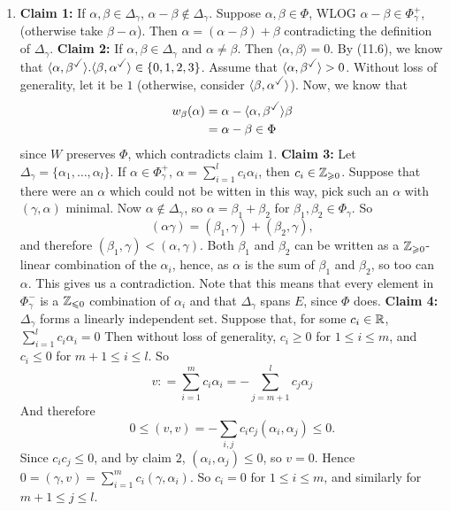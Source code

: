 \documentclass{article}
\begin{document}
\begin{enumerate}
    \item \textbf{Claim 1: }If $\alpha,\beta \in \Delta_{\gamma}$, $\alpha-\beta \notin \Delta_{\gamma}$. \gap Suppose $\alpha, \beta \in \Phi$, WLOG $\alpha-\beta \in \Phi^{+}_{\gamma}$, (otherwise take $\beta - \alpha$). Then $\alpha = (\alpha-\beta) + \beta$ contradicting the definition of $\Delta_{\gamma}$.\gap 
    \textbf{Claim 2: } If $\alpha, \beta \in \Delta_{\gamma}$ and $\alpha \neq \beta$. Then $\langle \alpha, \beta \rangle =0$. By (11.6), we know that $\langle \alpha, \beta^{\checked} \rangle . \langle \beta, \alpha^{\checked} \rangle \in \{0,1,2,3\}$. Assume that $\langle \alpha, \beta^{\checked} \rangle >0$. Without loss of generality, let it be $1$ (otherwise, consider $\langle \beta, \alpha^{\checked} \rangle$). Now, we know that 
    \begin{align*}
         w_{\beta}(\alpha)&=\alpha - \langle \alpha, \beta^{\checked} \rangle \beta\\
         &= \alpha - \beta \in \Phi
    \end{align*}
    since $W$ preserves $\Phi$, which contradicts claim $1$.\gap 
    \textbf{Claim 3: }Let $\Delta_{\gamma} = \{ \alpha_{1}, \dots, \alpha_{l} \}$. If $\alpha \in \Phi^{+}_{\gamma}$, $\alpha = \sum_{i=1}^{l}c_{i}\alpha_{i}$, then $c_{i} \in \mathbb{Z}_{\geqslant 0}$. Suppose that there were an $\alpha$ which could not be witten in this way, pick such an $\alpha$ with $(\gamma,\alpha)$ minimal. Now $\alpha \notin \Delta_{\gamma}$, so $\alpha = \beta_{1} + \beta_{2}$ for $\beta_{1},\beta_{2} \in \Phi_{\gamma}$. So \[ (\alpha \gamma) = (\beta_{1},\gamma) + (\beta_{2},\gamma),\]
    and therefore $(\beta_{1},\gamma)<(\alpha,\gamma)$. Both $\beta_{1}$ and $\beta_{2}$ can be written as a $\mathbb{Z}_{\geqslant 0}$-linear combination of the $\alpha_{i}$, hence, as $\alpha$ is the sum of $\beta_{1}$ and $\beta_{2}$, so too can $\alpha$. This gives us a contradiction. \gap Note that this means that every element in $\Phi^{-}_{\gamma}$ is a $\mathbb{Z}_{\leqslant 0}$ combination of $\alpha_{i}$ and that $\Delta_{\gamma}$ spans $E$, since $\Phi$ does. \gap \textbf{Claim 4: }$\Delta_{\gamma}$ forms a linearly independent set. Suppose that, for some $c_{i} \in \mathbb{R}$, $\sum_{i=1}^{l}c_{i}\alpha_{i}=0$ Then without loss of generality, $c_{i} \geq 0$ for $1 \leq i \leq m$, and $c_{i} \leq 0$ for $m+1 \leq i \leq l$. So \[ v: = \sum_{i=1}^{m}c_{i}\alpha_{i} = - \sum_{j=m+1}^{l}c_{j}\alpha_{j} \]
    And therefore \[ 0 \leq (v,v) = -\sum_{i,j}c_{i}c_{j}(\alpha_{i},\alpha_{j}) \leq 0.\]
    Since $c_{i}c_{j}\leq 0$, and by claim $2$, $(\alpha_{i},\alpha_{j}) \leq 0$, so $v=0$. Hence $0=(\gamma, v) = \sum_{i=1}^{m}c_{i}(\gamma, \alpha_{i})$. So $c_{i}=0$ for $1 \leq i \leq m$, and similarly for $m+1 \leq j \leq l$.

\end{enumerate}
\end{document}
